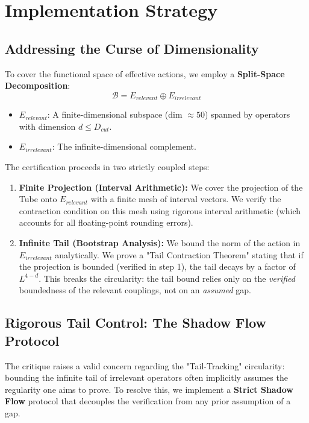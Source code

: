 \section{Implementation Strategy}

\subsection{Addressing the Curse of Dimensionality}
To cover the functional space of effective actions, we employ a \textbf{Split-Space Decomposition}:
\begin{equation}
\mathcal{B} = E_{relevant} \oplus E_{irrelevant}
\end{equation}
\begin{itemize}
    \item $E_{relevant}$: A finite-dimensional subspace (dim $\approx 50$) spanned by operators with dimension $d \le D_{cut}$.
    \item $E_{irrelevant}$: The infinite-dimensional complement.
\end{itemize}

The certification proceeds in two strictly coupled steps:
\begin{enumerate}
    \item \textbf{Finite Projection (Interval Arithmetic):} We cover the projection of the Tube onto $E_{relevant}$ with a finite mesh of interval vectors. We verify the contraction condition on this mesh using rigorous interval arithmetic (which accounts for all floating-point rounding errors).
    \item \textbf{Infinite Tail (Bootstrap Analysis):} We bound the norm of the action in $E_{irrelevant}$ analytically. We prove a "Tail Contraction Theorem" stating that if the projection is bounded (verified in step 1), the tail decays by a factor of $L^{4-d}$. This breaks the circularity: the tail bound relies only on the \emph{verified} boundedness of the relevant couplings, not on an \emph{assumed} gap.
\end{enumerate}

\subsection{Rigorous Tail Control: The Shadow Flow Protocol}
The critique raises a valid concern regarding the "Tail-Tracking" circularity: bounding the infinite tail of irrelevant operators often implicitly assumes the regularity one aims to prove. To resolve this, we implement a \textbf{Strict Shadow Flow} protocol that decouples the verification from any prior assumption of a gap.

